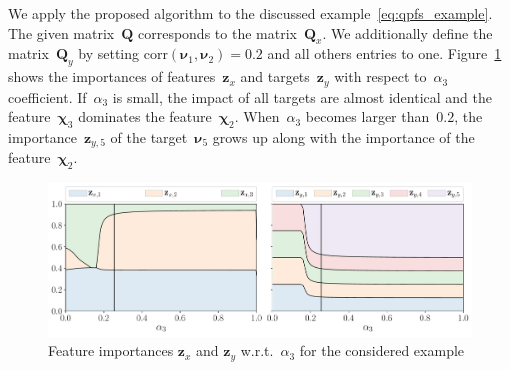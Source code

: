 \documentclass[12pt,oneside]{article}
\theoremstyle{definition}
\newcommand{\bz}{\mathbf{z}}
\newcommand{\bQ}{\mathbf{Q}}
\newcommand{\bchi}{\boldsymbol{\chi}}
\newcommand{\bnu}{\boldsymbol{\nu}}
\begin{document}
We apply the proposed algorithm to the discussed example~\eqref{eq:qpfs_example}.
The given matrix~$\bQ$ corresponds to the matrix~$\bQ_x$.
We additionally define the matrix~$\bQ_y$ by setting $\text{corr}(\bnu_1, \bnu_2) = 0.2$ and all others entries to one.
Figure~\ref{fig:features_vs_alpha} shows the importances of features~$\bz_x$ and targets~$\bz_y$ with respect to~$\alpha_3$ coefficient.
If~$\alpha_3$ is small, the impact of all targets are almost identical and the feature~$\bchi_3$ dominates the feature~$\bchi_2$. When~$\alpha_3$ becomes larger than~$0.2$, the importance~$\bz_{y,5}$ of the target~$\bnu_5$ grows up along with the importance of the feature~$\bchi_2$.

\begin{figure}
	\centering
	\includegraphics[width=\linewidth]{figs/features_vs_alpha.pdf}
	\caption{Feature importances $\bz_x$ and $\bz_y$ w.r.t.~$\alpha_3$ for the considered example}
	\label{fig:features_vs_alpha}
\end{figure}
\end{document}
